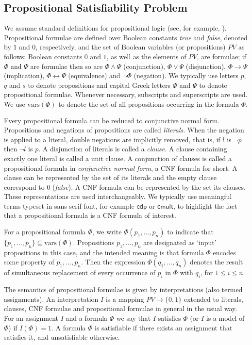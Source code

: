 \documentclass{article} \usepackage[utf8]{inputenc}
\newcommand*{\vars}{\ensuremath{\mathrm{vars}}}
\newcommand*{\edp}{\ensuremath{\mathsf{edp}}}
\newcommand*{\cmult}{\ensuremath{\mathsf{cmult}}}
\begin{document}
\subsection{Propositional Satisfiability Problem}
We assume standard definitions for propositional logic (see, for example,
\cite{rautenberg}).  Propositional formulae are defined over Boolean constants
\emph{true} and \emph{false}, denoted by $1$ and $0$, respectively, and the set
of Boolean variables (or propositions) $PV$ as follows: Boolean constants $0$
and $1$, as well as the elements of $PV$, are formulae; if $\Phi$ and $\Psi$
are formulae then so are $\Phi\land\Psi$ (conjunction), $\Phi\lor\Psi$
(disjunction), $\Phi\rightarrow\Psi$ (implication), $\Phi\leftrightarrow\Psi$
(equivalence) and $\lnot \Phi$ (negation).  We
typically use letters $p$, $q$ and $s$ to denote propositions and 
capital Greek letters $\Phi$ and $\Psi$ to denote propositional formulae. Whenever
necessary, subscripts and superscripts are used. We use $\vars(\Phi)$ to denote
the set of all propositions occurring in the formula $\Phi$.

Every propositional formula can be reduced to conjunctive normal form.  Propositions and
negations of propositions are called \emph{literals}.
When the negation is applied to a literal, double negations are implicitly 
removed, that is, if $l$ is $\lnot p$ then $\lnot l$ is $p$.
A disjunction of literals
is called a \emph{clause}. A clause containing exactly one literal is called
a unit clause. A conjunction of clauses is called a
propositional formula in \emph{conjunctive normal form}, a CNF formula for short. 
A clause can be represented by the set of its literals and the empty 
clause correspond to $0$ (\emph{false}).
A CNF formula can be represented by the set its clauses. These
representations are used interchangeably. 
We typically use meaningful terms typeset in sans serif font,
for example $\edp$ or $\cmult$,
to highlight the fact that a propositional formula is a CNF formula of interest.

For a propositional formula $\Phi$, we write $\Phi(p_1,\dots,p_n)$ to indicate
that $\{p_1,\dots,p_n\}\subseteq \vars(\Phi)$. Propositions $p_1,\dots, p_n$
are designated as `input' propositions in this case, and the intended meaning
is that formula $\Phi$ encodes some property of $p_1,\dots, p_n$. Then the
expression $\Phi(q_1,\dots,q_n)$ denotes the result of simultaneous replacement
of every occurrence of $p_i$ in $\Phi$  with $q_i$, for $1\leq i \leq n$.

The semantics of propositional formulae is given by interpretations (also termed
assignments).  An
interpretation $I$ is a mapping $PV\to\{0,1\}$ extended to literals, clauses,
CNF formulae and propositional formulae in general in the usual way.
For an assignment $I$ and a formula $\Phi$ we say that $I$ satisfies $\Phi$ 
(or $I$ is a model of $\Phi$) if $I(\Phi) = 1$.
A formula $\Phi$ is satisfiable if there exists an assignment that satisfies
it, and unsatisfiable otherwise.
\end{document}
